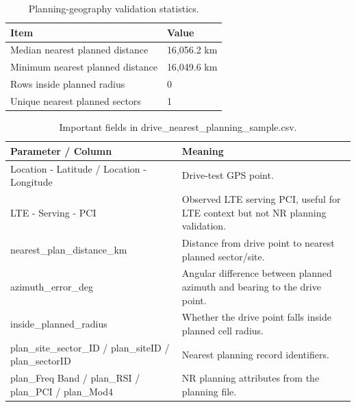 \documentclass[12pt,a4paper]{article}
\begin{document}
\begin{table}[H]
\centering
\begin{tabularx}{0.94\textwidth}{P{5.2cm}Y}
\toprule
\textbf{Item} & \textbf{Value} \\
\midrule
Median nearest planned distance & 16,056.2 km \\
Minimum nearest planned distance & 16,049.6 km \\
Rows inside planned radius & 0 \\
Unique nearest planned sectors & 1 \\
\bottomrule
\end{tabularx}
\caption{Planning-geography validation statistics.}
\end{table}


\begin{table}[H]
\centering
\begin{tabularx}{\textwidth}{P{0.38\textwidth}Y}
\toprule
\textbf{Parameter / Column} & \textbf{Meaning} \\
\midrule
{\ttfamily Location -\allowbreak{} Latitude /\allowbreak{} Location -\allowbreak{} Longitude} & Drive-test GPS point. \\
{\ttfamily LTE -\allowbreak{} Serving -\allowbreak{} PCI} & Observed LTE serving PCI, useful for LTE context but not NR planning validation. \\
{\ttfamily nearest\_\allowbreak{}plan\_\allowbreak{}distance\_\allowbreak{}km} & Distance from drive point to nearest planned sector/site. \\
{\ttfamily azimuth\_\allowbreak{}error\_\allowbreak{}deg} & Angular difference between planned azimuth and bearing to the drive point. \\
{\ttfamily inside\_\allowbreak{}planned\_\allowbreak{}radius} & Whether the drive point falls inside planned cell radius. \\
{\ttfamily plan\_\allowbreak{}site\_\allowbreak{}sector\_\allowbreak{}ID /\allowbreak{} plan\_\allowbreak{}siteID /\allowbreak{} plan\_\allowbreak{}sectorID} & Nearest planning record identifiers. \\
{\ttfamily plan\_\allowbreak{}Freq Band /\allowbreak{} plan\_\allowbreak{}RSI /\allowbreak{} plan\_\allowbreak{}PCI /\allowbreak{} plan\_\allowbreak{}Mod4} & NR planning attributes from the planning file. \\
\bottomrule
\end{tabularx}
\caption{Important fields in drive\_nearest\_planning\_sample.csv.}
\end{table}
\end{document}
